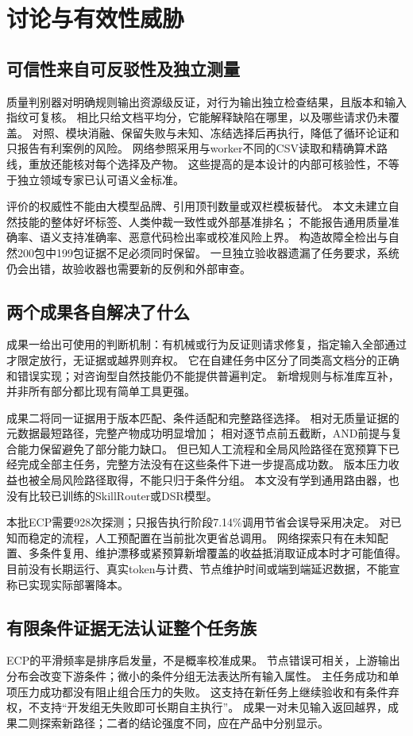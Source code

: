 \section{讨论与有效性威胁}
\subsection{可信性来自可反驳性及独立测量}
质量判别器对明确规则输出资源级反证，对行为输出独立检查结果，且版本和输入指纹可复核。
相比只给文档平均分，它能解释缺陷在哪里，以及哪些请求仍未覆盖。
对照、模块消融、保留失败与未知、冻结选择后再执行，降低了循环论证和只报告有利案例的风险。
网络参照采用与worker不同的CSV读取和精确算术路线，重放还能核对每个选择及产物。
这些提高的是本设计的内部可核验性，不等于独立领域专家已认可语义金标准。

评价的权威性不能由大模型品牌、引用顶刊数量或双栏模板替代。
本文未建立自然技能的整体好坏标签、人类仲裁一致性或外部基准排名；
不能报告通用质量准确率、语义支持准确率、恶意代码检出率或校准风险上界。
构造故障全检出与自然200包中199包证据不足必须同时保留。
一旦独立验收器遗漏了任务要求，系统仍会出错，故验收器也需要新的反例和外部审查。

\subsection{两个成果各自解决了什么}
成果一给出可使用的判断机制：有机械或行为反证则请求修复，指定输入全部通过才限定放行，无证据或越界则弃权。
它在自建任务中区分了同类高文档分的正确和错误实现；对咨询型自然技能仍不能提供普遍判定。
新增规则与标准库互补，并非所有部分都比现有简单工具更强。

成果二将同一证据用于版本匹配、条件适配和完整路径选择。
相对无质量证据的元数据最短路径，完整产物成功明显增加；
相对逐节点前五截断，AND前提与复合能力保留避免了部分能力缺口。
但已知人工流程和全局风险路径在宽预算下已经完成全部主任务，完整方法没有在这些条件下进一步提高成功数。
版本压力收益也被全局风险路径取得，不能只归于条件分组。
本文没有学到通用路由器，也没有比较已训练的SkillRouter或DSR模型。

本批ECP需要928次探测；只报告执行阶段7.14\%调用节省会误导采用决定。
对已知而稳定的流程，人工预配置在当前批次更省总调用。
网络探索只有在未知配置、多条件复用、维护漂移或紧预算新增覆盖的收益抵消取证成本时才可能值得。
目前没有长期运行、真实token与计费、节点维护时间或端到端延迟数据，不能宣称已实现实际部署降本。

\subsection{有限条件证据无法认证整个任务族}
ECP的平滑频率是排序启发量，不是概率校准成果。
节点错误可相关，上游输出分布会改变下游条件；微小的条件分组无法表达所有输入属性。
主任务成功和单项压力成功都没有阻止组合压力的失败。
这支持在新任务上继续验收和有条件弃权，不支持“开发组无失败即可长期自主执行”。
成果一对未见输入返回越界，成果二则探索新路径；二者的结论强度不同，应在产品中分别显示。

